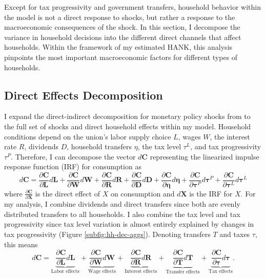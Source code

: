 Except for tax progressivity and government transfers, household behavior within the model is not a direct response to shocks, but rather a response to the macroeconomic consequences of the shock. In this section, I decompose the variance in household decisions into the different direct channels that affect households. Within the framework of my estimated HANK, this analysis pinpoints the most important macroeconomic factors for different types of households.

\subsection{Direct Effects Decomposition}
I expand the direct-indirect decomposition for monetary policy shocks from \textcite{kaplan2018monetary} to the full set of shocks and direct household effects within my model. Household conditions depend on the union's labor supply choice $L$, wages $W$, the interest rate $R$, dividends $D$, household transfers $\eta$, the tax level $\tau^L$, and tax progressivity $\tau^P$. Therefore, I can decompose the vector $d \mathbf{C}$ representing the linearized impulse response function (IRF) for consumption as 
\[
    d \mathbf{C} = \frac{\partial \mathbf{C}}{\partial \mathbf{L}} d \mathbf{L} + \frac{\partial \mathbf{C}}{\partial \mathbf{W}} d \mathbf{W} + \frac{\partial \mathbf{C}}{\partial \mathbf{R}} d \mathbf{R} + \frac{\partial \mathbf{C}}{\partial \mathbf{D}} d \mathbf{D} + \frac{\partial \mathbf{C}}{\partial \boldsymbol{\eta}} d \boldsymbol{\eta} + \frac{\partial \mathbf{C}}{\partial \boldsymbol{\tau}^P} d \boldsymbol{\tau}^P + \frac{\partial \mathbf{C}}{\partial \boldsymbol{\tau}^L} d \boldsymbol{\tau}^L
\]
where $\frac{\partial \mathbf{C}}{\partial \mathbf{X}}$ is the direct effect of $X$ on consumption and $d \mathbf{X}$ is the IRF for $X$. For my analysis, I combine dividends and direct transfers since both are evenly distributed transfers to all households. I also combine the tax level and tax progressivity since tax level variation is almost entirely explained by changes in tax progressivity (Figure \ref{subfig:hh-dec-aggs}). Denoting transfers $T$ and taxes $\tau$, this means
\[
    d \mathbf{C} = \underbrace{\frac{\partial \mathbf{C}}{\partial \mathbf{L}} d \mathbf{L}}_{\text{Labor effects}} + \underbrace{\frac{\partial \mathbf{C}}{\partial \mathbf{W}} d \mathbf{W}}_{\text{Wage effects}} + \underbrace{\frac{\partial \mathbf{C}}{\partial \mathbf{R}} d \mathbf{R}}_{\text{Interest effects}} + \underbrace{\frac{\partial \mathbf{C}}{\partial \mathbf{T}} d \mathbf{T}}_{\text{Transfer effects}} + \underbrace{\frac{\partial \mathbf{C}}{\partial \boldsymbol{\tau}} d \boldsymbol{\tau}}_{\text{Tax effects}}.
\]

